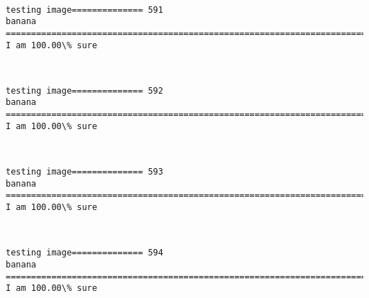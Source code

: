 \documentclass[11pt]{article}
\begin{document}
    \begin{center}
    \end{center}
    { \hspace*{\fill} \\}
    
    \begin{Verbatim}[commandchars=\\\{\}]
testing image============== 591
banana
============================================================================
I am 100.00\% sure

    \end{Verbatim}

    \begin{center}
    \end{center}
    { \hspace*{\fill} \\}
    
    \begin{Verbatim}[commandchars=\\\{\}]
testing image============== 592
banana
============================================================================
I am 100.00\% sure

    \end{Verbatim}

    \begin{center}
    \end{center}
    { \hspace*{\fill} \\}
    
    \begin{Verbatim}[commandchars=\\\{\}]
testing image============== 593
banana
============================================================================
I am 100.00\% sure

    \end{Verbatim}

    \begin{center}
    \end{center}
    { \hspace*{\fill} \\}
    
    \begin{Verbatim}[commandchars=\\\{\}]
testing image============== 594
banana
============================================================================
I am 100.00\% sure

    \end{Verbatim}
\end{document}
